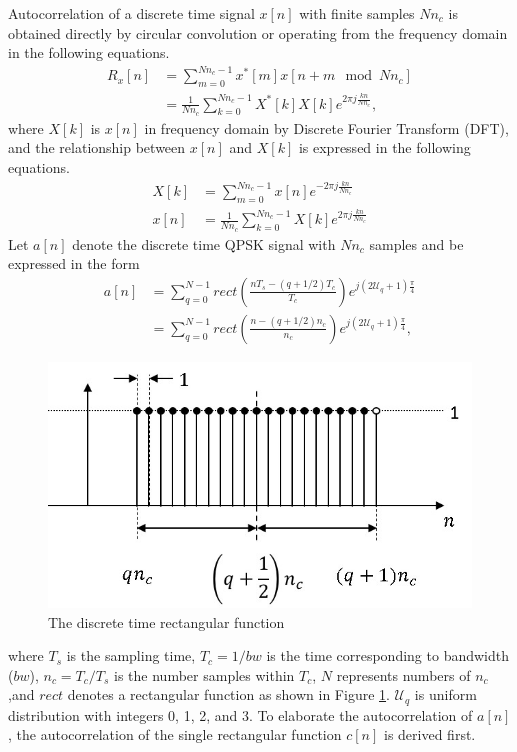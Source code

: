 \documentclass[draftcls,onecolumn]{IEEEtran}  %
\begin{document}
Autocorrelation of a discrete time signal $x[n]$ with finite samples $Nn_c$ is obtained directly by circular convolution or operating from the frequency domain in the following equations.
\begin{equation}\label{Eq: Auto_corx}
\begin{split}
R_x[n] &= \sum\limits_{m=0}^{Nn_c-1} x^*[m] x[n+m \mod Nn_c] \\
	 &= \frac{1}{Nn_c}\sum\limits_{k=0}^{Nn_c-1} X^*[k]X[k] e^{2\pi j \frac{kn}{Nn_c}},
\end{split}
\end{equation}
where $X[k]$ is $x[n]$ in frequency domain by Discrete Fourier Transform (DFT), and the relationship between $x[n]$ and $X[k]$ is expressed in the following equations.
\begin{equation}\label{Eq: xn_XK}
\begin{split}
X[k] &= \sum\limits_{m=0}^{Nn_c-1} x[n] e^{-2\pi j \frac{kn}{Nn_c}} \\
x[n] &= \frac{1}{Nn_c} \sum\limits_{k=0}^{Nn_c-1} X[k] e^{2\pi j \frac{kn}{Nn_c}} 
\end{split}
\end{equation}
Let $a[n]$ denote the discrete time QPSK signal with $Nn_c$ samples and be expressed in the form
\begin{equation}\label{Eq: a_n}
\begin{split}
a[n] &= \sum\limits_{q=0}^{N-1} rect(\frac{nT_s-(q+1/2)T_c}{T_c})e^{j(2\mathcal{U}_q+1)\frac{\pi}{4}} \\ 
	 &= \sum\limits_{q=0}^{N-1} rect(\frac{n-(q+1/2)n_c}{n_c})e^{j(2\mathcal{U}_q+1)\frac{\pi}{4}},    
     \end{split}
\end{equation}
\begin{figure}[t!]
	\centering
	\includegraphics[width=3 in]{pdf/a_n.jpg}
	\caption{The discrete time rectangular function}
	\label{fig:a_n}
\end{figure}
where $T_s$ is the sampling time, $T_c=1/bw$ is the time corresponding to bandwidth ($bw$), $n_c=T_c/T_s$ is the number samples within $T_c$, $N$ represents numbers of $n_c$ ,and $rect$ denotes a rectangular function as shown in Figure \ref{fig:a_n}. $\mathcal{U}_q$ is uniform distribution with integers 0, 1, 2, and 3. To elaborate the autocorrelation of $a[n]$, the autocorrelation of the single rectangular function $c[n]$ is derived first. 
\end{document}
